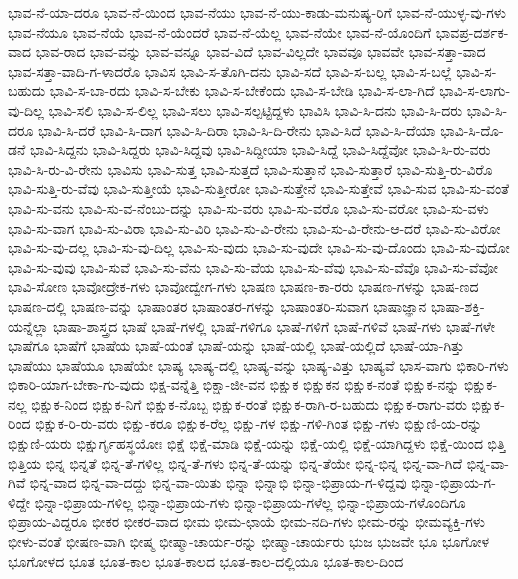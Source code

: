 {ಭಾವ-ನೆ-ಯಾ-ದರೂ
ಭಾವ-ನೆ-ಯಿಂದ
ಭಾವ-ನೆಯು
ಭಾವ-ನೆ-ಯು-ಕಾಡು-ಮನುಷ್ಯ-ರಿಗೆ
ಭಾವ-ನೆ-ಯುಳ್ಳ-ವು-ಗಳು
ಭಾವ-ನೆಯೂ
ಭಾವ-ನೆಯೆ
ಭಾವ-ನೆ-ಯೆಂದರೆ
ಭಾವ-ನೆ-ಯೆಲ್ಲ
ಭಾವ-ನೆಯೇ
ಭಾವ-ನೆ-ಯೊಂದಿಗೆ
ಭಾವಪ್ರ-ದರ್ಶಕ-ವಾದ
ಭಾವ-ರಾದ
ಭಾವ-ವನ್ನು
ಭಾವ-ವನ್ನೂ
ಭಾವ-ವಿದೆ
ಭಾವ-ವಿಲ್ಲದೇ
ಭಾವವೂ
ಭಾವವೇ
ಭಾವ-ಸತ್ತಾ-ವಾದ
ಭಾವ-ಸತ್ತಾ-ವಾದಿ-ಗ-ಳಾದರೊ
ಭಾವಿಸ
ಭಾವಿ-ಸ-ತೊಗಿ-ದನು
ಭಾವಿ-ಸದೆ
ಭಾವಿ-ಸ-ಬಲ್ಲ
ಭಾವಿ-ಸ-ಬಲ್ಲೆ
ಭಾವಿ-ಸ-ಬಹುದು
ಭಾವಿ-ಸ-ಬಾ-ರದು
ಭಾವಿ-ಸ-ಬೇಕು
ಭಾವಿ-ಸ-ಬೇಕೆಂದು
ಭಾವಿ-ಸ-ಬೇಡಿ
ಭಾವಿ-ಸ-ಲಾ-ಗಿದೆ
ಭಾವಿ-ಸ-ಲಾಗು-ವು-ದಿಲ್ಲ
ಭಾವಿ-ಸಲಿ
ಭಾವಿ-ಸ-ಲಿಲ್ಲ
ಭಾವಿ-ಸಲು
ಭಾವಿ-ಸಲ್ಪಟ್ಟಿದ್ದಳು
ಭಾವಿಸಿ
ಭಾವಿ-ಸಿ-ದನು
ಭಾವಿ-ಸಿ-ದರು
ಭಾವಿ-ಸಿ-ದರೂ
ಭಾವಿ-ಸಿ-ದರೆ
ಭಾವಿ-ಸಿ-ದಾಗ
ಭಾವಿ-ಸಿ-ದಿರಾ
ಭಾವಿ-ಸಿ-ದಿ-ರೇನು
ಭಾವಿ-ಸಿದೆ
ಭಾವಿ-ಸಿ-ದೆಯಾ
ಭಾವಿ-ಸಿ-ದೊ-ಡನೆ
ಭಾವಿ-ಸಿದ್ದನು
ಭಾವಿ-ಸಿದ್ದರು
ಭಾವಿ-ಸಿದ್ದವು
ಭಾವಿ-ಸಿದ್ದೀಯಾ
ಭಾವಿ-ಸಿದ್ದೆ
ಭಾವಿ-ಸಿದ್ದೆವೋ
ಭಾವಿ-ಸಿ-ರು-ವರು
ಭಾವಿ-ಸಿ-ರು-ವಿ-ರೇನು
ಭಾವಿಸು
ಭಾವಿ-ಸುತ್ತ
ಭಾವಿ-ಸುತ್ತದೆ
ಭಾವಿ-ಸುತ್ತಾನೆ
ಭಾವಿ-ಸುತ್ತಾರೆ
ಭಾವಿ-ಸುತ್ತಿ-ರು-ವಿರೊ
ಭಾವಿ-ಸುತ್ತಿ-ರು-ವೆವು
ಭಾವಿ-ಸುತ್ತೀಯೆ
ಭಾವಿ-ಸುತ್ತೀರೋ
ಭಾವಿ-ಸುತ್ತೇನೆ
ಭಾವಿ-ಸುತ್ತೇವೆ
ಭಾವಿ-ಸುವ
ಭಾವಿ-ಸು-ವಂತೆ
ಭಾವಿ-ಸು-ವನು
ಭಾವಿ-ಸು-ವ-ನೆಂಬು-ದನ್ನು
ಭಾವಿ-ಸು-ವರು
ಭಾವಿ-ಸು-ವರೊ
ಭಾವಿ-ಸು-ವರೋ
ಭಾವಿ-ಸು-ವಳು
ಭಾವಿ-ಸು-ವಾಗ
ಭಾವಿ-ಸು-ವಿರಾ
ಭಾವಿ-ಸು-ವಿರಿ
ಭಾವಿ-ಸು-ವಿ-ರೇನು
ಭಾವಿ-ಸು-ವಿ-ರೇನು-ಆ-ದರೆ
ಭಾವಿ-ಸು-ವಿರೋ
ಭಾವಿ-ಸು-ವು-ದಲ್ಲ
ಭಾವಿ-ಸು-ವು-ದಿಲ್ಲ
ಭಾವಿ-ಸು-ವುದು
ಭಾವಿ-ಸು-ವುದೇ
ಭಾವಿ-ಸು-ವು-ದೊಂದು
ಭಾವಿ-ಸು-ವುದೋ
ಭಾವಿ-ಸು-ವುವು
ಭಾವಿ-ಸುವೆ
ಭಾವಿ-ಸು-ವೆನು
ಭಾವಿ-ಸು-ವೆಯ
ಭಾವಿ-ಸು-ವೆವು
ಭಾವಿ-ಸು-ವೆವೊ
ಭಾವಿ-ಸು-ವೆವೋ
ಭಾವಿ-ಸೋಣ
ಭಾವೋದ್ರೇಕ-ಗಳು
ಭಾವೋದ್ವೇಗ-ಗಳು
ಭಾಷಣ
ಭಾಷಣ-ಕಾ-ರರು
ಭಾಷಣ-ಗಳನ್ನು
ಭಾಷ-ಣದ
ಭಾಷಣ-ದಲ್ಲಿ
ಭಾಷಣ-ವನ್ನು
ಭಾಷಾಂತರ
ಭಾಷಾಂತರ-ಗಳನ್ನು
ಭಾಷಾಂತರಿ-ಸುವಾಗ
ಭಾಷಾಜ್ಞಾನ
ಭಾಷಾ-ಶಕ್ತಿ-ಯನ್ನೆಲ್ಲಾ
ಭಾಷಾ-ಶಾಸ್ತ್ರದ
ಭಾಷೆ
ಭಾಷೆ-ಗಳಲ್ಲಿ
ಭಾಷೆ-ಗಳಿಗೂ
ಭಾಷೆ-ಗಳಿಗೆ
ಭಾಷೆ-ಗಳಿವೆ
ಭಾಷೆ-ಗಳು
ಭಾಷೆ-ಗಳೇ
ಭಾಷೆಗೂ
ಭಾಷೆಗೆ
ಭಾಷೆಯ
ಭಾಷೆ-ಯಂತೆ
ಭಾಷೆ-ಯನ್ನು
ಭಾಷೆ-ಯಲ್ಲಿ
ಭಾಷೆ-ಯಲ್ಲಿದೆ
ಭಾಷೆ-ಯಾ-ಗಿತ್ತು
ಭಾಷೆಯು
ಭಾಷೆಯೂ
ಭಾಷೆಯೇ
ಭಾಷ್ಯ
ಭಾಷ್ಯ-ದಲ್ಲಿ
ಭಾಷ್ಯ-ವನ್ನು
ಭಾಷ್ಯ-ವಿತ್ತು
ಭಾಷ್ಯವೆ
ಭಾಸ-ವಾಗು
ಭಿಕಾರಿ-ಗಳು
ಭಿಕಾರಿ-ಯಾಗ-ಬೇಕಾ-ಗು-ವುದು
ಭಿಕ್ಷ-ವನ್ನೆತ್ತಿ
ಭಿಕ್ಷಾ-ಜೀ-ವನ
ಭಿಕ್ಷುಕ
ಭಿಕ್ಷುಕನ
ಭಿಕ್ಷುಕ-ನಂತೆ
ಭಿಕ್ಷುಕ-ನನ್ನು
ಭಿಕ್ಷುಕ-ನಲ್ಲ
ಭಿಕ್ಷುಕ-ನಿಂದ
ಭಿಕ್ಷುಕ-ನಿಗೆ
ಭಿಕ್ಷುಕ-ನೊಬ್ಬ
ಭಿಕ್ಷುಕ-ರಂತೆ
ಭಿಕ್ಷುಕ-ರಾಗಿ-ರ-ಬಹುದು
ಭಿಕ್ಷುಕ-ರಾಗು-ವರು
ಭಿಕ್ಷುಕ-ರಿಂದ
ಭಿಕ್ಷುಕ-ರಿ-ರು-ವರು
ಭಿಕ್ಷು-ಕರೂ
ಭಿಕ್ಷುಕ-ರೆಲ್ಲ
ಭಿಕ್ಷು-ಗಳ
ಭಿಕ್ಷು-ಗಳಿ-ಗಿಂತ
ಭಿಕ್ಷು-ಗಳು
ಭಿಕ್ಷುಣಿ-ಯ-ರನ್ನು
ಭಿಕ್ಷುಣಿ-ಯರು
ಭಿಕ್ಷುರ್ಗೃಹಸ್ಥಯೋಃ
ಭಿಕ್ಷೆ
ಭಿಕ್ಷೆ-ಮಾಡಿ
ಭಿಕ್ಷೆ-ಯನ್ನು
ಭಿಕ್ಷೆ-ಯಲ್ಲಿ
ಭಿಕ್ಷೆ-ಯಾಗಿದ್ದಳು
ಭಿಕ್ಷೆ-ಯಿಂದ
ಭಿತ್ತಿ
ಭಿತ್ತಿಯ
ಭಿನ್ನ
ಭಿನ್ನತೆ
ಭಿನ್ನ-ತೆ-ಗಳಿಲ್ಲ
ಭಿನ್ನ-ತೆ-ಗಳು
ಭಿನ್ನ-ತೆ-ಯನ್ನು
ಭಿನ್ನ-ತೆಯೇ
ಭಿನ್ನ-ಭಿನ್ನ
ಭಿನ್ನ-ವಾ-ಗಿದೆ
ಭಿನ್ನ-ವಾ-ಗಿವೆ
ಭಿನ್ನ-ವಾದ
ಭಿನ್ನ-ವಾ-ದದ್ದು
ಭಿನ್ನ-ವಾ-ಯಿತು
ಭಿನ್ನಾ
ಭಿನ್ನಾಭಿ
ಭಿನ್ನಾ-ಭಿಪ್ರಾಯ-ಗ-ಳಿದ್ದವು
ಭಿನ್ನಾ-ಭಿಪ್ರಾಯ-ಗ-ಳಿದ್ದೇ
ಭಿನ್ನಾ-ಭಿಪ್ರಾಯ-ಗಳಿಲ್ಲ
ಭಿನ್ನಾ-ಭಿಪ್ರಾಯ-ಗಳು
ಭಿನ್ನಾ-ಭಿಪ್ರಾಯ-ಗಳೆಲ್ಲ
ಭಿನ್ನಾ-ಭಿಪ್ರಾಯ-ಗಳೊಂದಿಗೂ
ಭಿಪ್ರಾಯ-ವಿದ್ದರೂ
ಭೀಕರ
ಭೀಕರ-ವಾದ
ಭೀಮ
ಭೀಮ-ಛಾಯೆ
ಭೀಮ-ನದಿ-ಗಳು
ಭೀಮ-ರನ್ನು
ಭೀಮವ್ಯಕ್ತಿ-ಗಳು
ಭೀಳು-ವಂತೆ
ಭೀಷಣ-ವಾಗಿ
ಭೀಷ್ಮ
ಭೀಷ್ಮಾ-ಚಾರ್ಯ-ರನ್ನು
ಭೀಷ್ಮಾ-ಚಾರ್ಯರು
ಭುಜ
ಭುಜವೇ
ಭೂ
ಭೂಗೋಳ
ಭೂಗೋಳದ
ಭೂತ
ಭೂತ-ಕಾಲ
ಭೂತ-ಕಾಲದ
ಭೂತ-ಕಾಲ-ದಲ್ಲಿಯೂ
ಭೂತ-ಕಾಲ-ದಿಂದ
}
